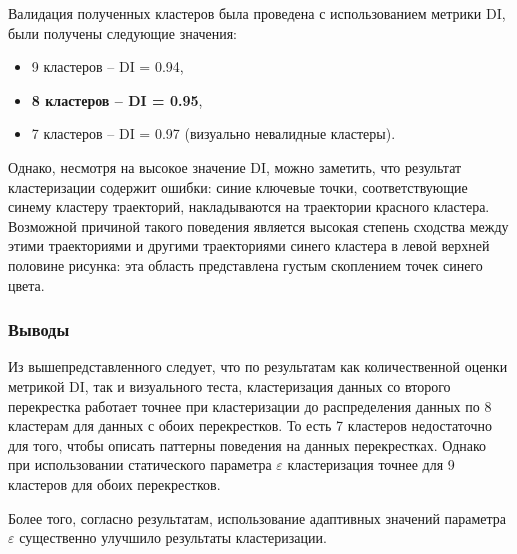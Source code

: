 Валидация полученных кластеров была проведена с использованием метрики DI, были получены следующие значения:
\begin{itemize}
	\setlength\itemsep{-0.5em}
	\item 9 кластеров -- DI = 0.94,
	\item \textbf{8 кластеров -- DI = 0.95},
	\item 7 кластеров -- DI = 0.97 (визуально невалидные кластеры).
\end{itemize}

Однако, несмотря на высокое значение DI, можно заметить, что результат кластеризации содержит ошибки: синие ключевые точки, соответствующие синему кластеру траекторий, накладываются на траектории красного кластера. Возможной причиной такого поведения является высокая степень сходства между этими траекториями и другими траекториями синего кластера в левой верхней половине рисунка: эта область представлена густым скоплением точек синего цвета.

\subsubsection{Выводы}

Из вышепредставленного следует, что по результатам как количественной оценки метрикой DI, так и визуального теста, кластеризация данных со второго перекрестка работает точнее при кластеризации до распределения данных по 8 кластерам для данных с обоих перекрестков. То есть 7 кластеров недостаточно для того, чтобы описать паттерны поведения на данных перекрестках. Однако при использовании статического параметра $\varepsilon$ кластеризация точнее для 9 кластеров для обоих перекрестков.

Более того, согласно результатам, использование адаптивных значений параметра $\varepsilon$ существенно улучшило результаты кластеризации.